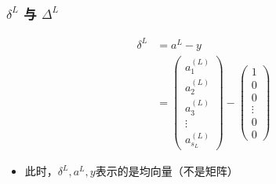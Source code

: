 \subsubsection{$\delta^{L}$ 与 $\Delta^{L}$}
\begin{equation}\begin{aligned}
	\delta^{L} &= a^{L} - y \\
		&= \left(\begin{matrix}
			a_1^{(L)} \\ a_2^{(L)} \\ a_3^{(L)} \\ \vdots \\ a_{s_L}^{(L)}
		\end{matrix}\right) - 
		\left(\begin{matrix}
	        1 \\ 0 \\ 0 \\ \vdots \\ 0 \\ 0 
		\end{matrix}\right)
\end{aligned}\end{equation}
\begin{itemize}
	\item 此时，$\delta^{L}, a^{L}, y$表示的是均向量（不是矩阵）
\end{itemize}


